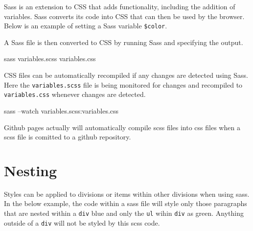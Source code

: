 \documentclass[]{book}
\newenvironment{Shaded}{\begin{snugshade}}{\end{snugshade}}
\newcommand{\ExtensionTok}[1]{#1}
\newcommand{\KeywordTok}[1]{\textcolor[rgb]{0.13,0.29,0.53}{\textbf{#1}}}
\newcommand{\NormalTok}[1]{#1}
\newcommand{\VariableTok}[1]{\textcolor[rgb]{0.00,0.00,0.00}{#1}}
\begin{document}
Sass is an extension to CSS that adds functionality, including the addition of variables. Sass converts its code into CSS that can then be used by the browser. Below is an example of setting a Sass variable \texttt{\$color}.

\begin{Shaded}
\end{Shaded}

A Sass file is then converted to CSS by running Sass and specifying the output.

\begin{Shaded}
\begin{Highlighting}[]
\ExtensionTok{sass}\NormalTok{ variables.scss variables.css}
\end{Highlighting}
\end{Shaded}

CSS files can be automatically recompiled if any changes are detected using Sass. Here the \texttt{variables.scss} file is being monitored for changes and recompiled to \texttt{variables.css} whenever changes are detected.

\begin{Shaded}
\begin{Highlighting}[]
\ExtensionTok{sass}\NormalTok{ --watch variables.scss:variables.css}
\end{Highlighting}
\end{Shaded}

Github pages actually will automatically compile scss files into css files when a scss file is comitted to a github repository.

\hypertarget{nesting}{%
\section{Nesting}\label{nesting}}

Styles can be applied to divisions or items within other divisions when using sass. In the below example, the code within a sass file will style only those paragraphs that are nested within a \texttt{div} blue and only the \texttt{ul} wihin \texttt{div} as green. Anything outside of a \texttt{div} will not be styled by this scss code.
\end{document}
